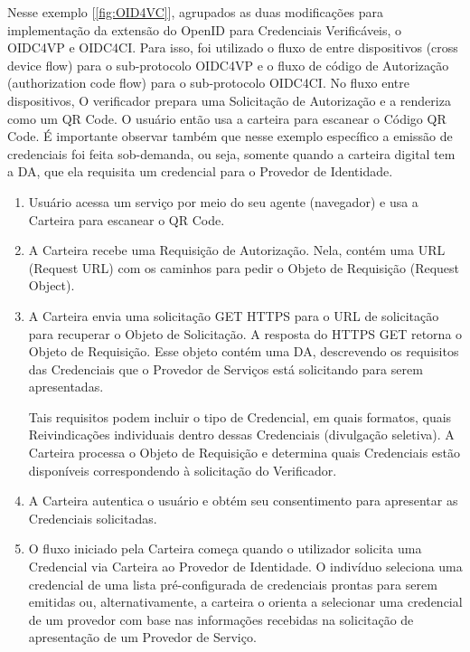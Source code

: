 Nesse exemplo [\ref{fig:OID4VC}], agrupados as duas modificações para implementação da extensão do OpenID para Credenciais Verificáveis, o \acs{OIDC4VP} e \acs{OIDC4CI}. Para isso, foi utilizado o fluxo de entre dispositivos (cross device flow) para o sub-protocolo \acs{OIDC4VP} e o fluxo de código de Autorização (authorization code flow) para o sub-protocolo \acs{OIDC4CI}. No fluxo entre dispositivos, O verificador prepara uma Solicitação de Autorização e a renderiza como um QR Code. O usuário então usa a carteira para escanear o Código QR Code. É importante observar também que nesse exemplo específico a emissão de credenciais foi feita sob-demanda, ou seja, somente quando a carteira digital tem a \acs{DA}, que ela requisita um credencial para o Provedor de Identidade. 


\begin{enumerate}

    \item Usuário acessa um serviço por meio do seu agente (navegador) e usa a Carteira para escanear o QR Code.
    
    \item A Carteira recebe uma Requisição de Autorização. Nela, contém uma URL (Request URL) com os caminhos para pedir o Objeto de Requisição (Request Object).

    \item A Carteira envia uma solicitação GET HTTPS para o URL de solicitação para recuperar o Objeto de Solicitação. A resposta do HTTPS GET retorna o Objeto de Requisição. Esse objeto contém uma \acs{DA}, descrevendo os requisitos das Credenciais que o Provedor de Serviços está solicitando para serem apresentadas. 
    
    Tais requisitos podem incluir o tipo de Credencial, em quais formatos, quais Reivindicações individuais dentro dessas Credenciais (divulgação seletiva). A Carteira processa o Objeto de Requisição e determina quais Credenciais estão disponíveis correspondendo à solicitação do Verificador. 
    
    \item A Carteira autentica o usuário e obtém seu consentimento para apresentar as Credenciais solicitadas.
    
    \item O fluxo iniciado pela Carteira começa quando o utilizador solicita uma Credencial via Carteira ao Provedor de Identidade. O indivíduo seleciona uma credencial de uma lista pré-configurada de credenciais prontas para serem emitidas ou, alternativamente, a carteira o orienta a selecionar uma credencial de um provedor com base nas informações recebidas na solicitação de apresentação de um Provedor de Serviço.



\end{enumerate}
